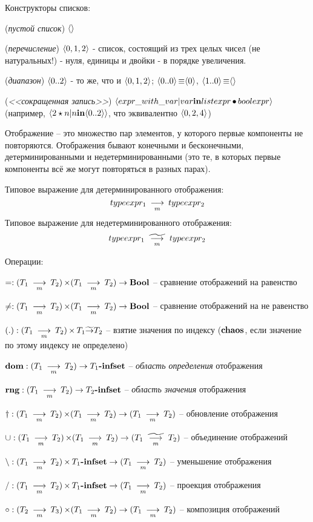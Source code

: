 Конструкторы списков:
\begin{list}{}{}
\item (\emph{пустой список}) $\LL\LR$
\item (\emph{перечисление}) $\LL 0, 1, 2 \LR$ - список, состоящий из трех целых чисел (не натуральных!) - нуля, единицы и двойки - в порядке увеличения.
\item (\emph{диапазон}) $\LL 0..2 \LR$ -  то же, что и $\LL 0, 1, 2 \LR$; $\LL 0..0 \LR \Iden \LL 0 \LR$, $\LL 1..0 \LR \Iden \LL\LR$
\item (\emph{<<сокращенная запись>>}) $\LL expr\_with\_var | var \In listexpr \SuchAs boolexpr\LR$ (например, $\LL 2 \star n | n \In \LL 0..2 \LR \LR$, что эквивалентно $\LL 0, 2, 4 \LR$)
\end{list}


Отображение -- это множество пар элементов, у которого первые компоненты не повторяются. Отображения бывают конечными и бесконечными, детерминированными и недетерминированными (это те, в которых первые компоненты всё же могут повторяться в разных парах).

Типовое выражение для детерминированного отображения: $$typeexpr_1 \Map typeexpr_2$$ Типовое выражение для недетерминированного отображения: $$typeexpr_1 \NonDeterMap typeexpr_2$$

Операции:
\begin{list}{}{}
\item $=: (T_1 \Map T_2) \DP (T_1 \Map T_2) \Fn \Bool$ -- сравнение отображений на равенство
\item $\neq: (T_1 \Map T_2) \DP (T_1 \Map T_2) \Fn \Bool$ -- сравнение отображений на не равенство
\item $(.): (T_1 \Map T_2) \DP T_1 \NonDetermFn T_2$ -- взятие значения по индексу ($\Chaos$, если значение по этому индексу не
определено)
\item $\Dom: (T_1 \Map T_2) \Fn T_1\Infset$ -- \emph{область определения} отображения
\item $\Rng: (T_1 \Map T_2) \Fn T_2\Infset$ -- \emph{область значения} отображения
\item $\Upd: (T_1 \Map T_2) \DP (T_1 \Map T_2) \Fn (T_1 \Map T_2)$ -- обновление отображения
\item $\Union: (T_1 \Map T_2) \DP (T_1 \Map T_2) \Fn (T_1 \NonDeterMap T_2)$ -- объединение отображений
\item $\Minus: (T_1 \Map T_2) \DP T_1\Infset \Fn (T_1 \Map T_2)$ -- уменьшение отображения
\item $/: (T_1 \Map T_2) \DP T_1\Infset \Fn (T_1 \Map T_2)$ -- проекция отображения
\item $\Superp: (T_2 \Map T_3) \DP (T_1 \Map T_2) \Fn (T_1 \Map T_2)$ -- композиция отображений
\end{list}

